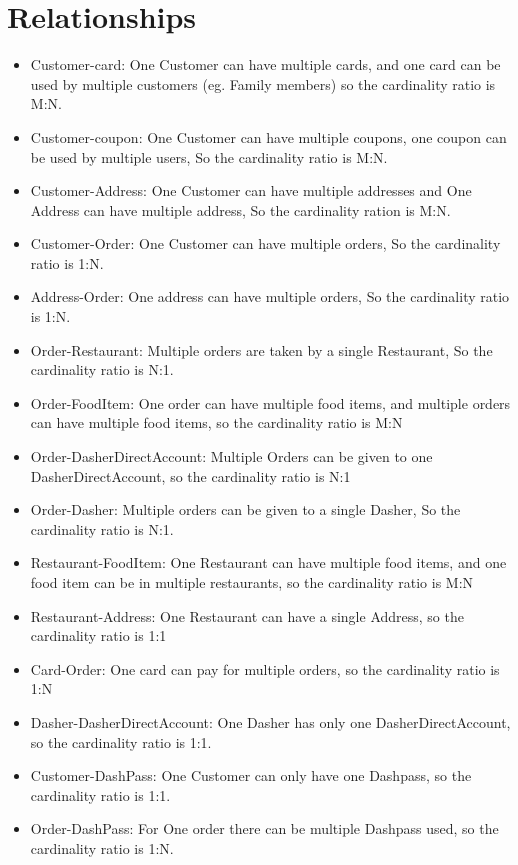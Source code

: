 \documentclass[12pt,letterpaper]{article}
\begin{document}
\section{Relationships}
\begin{itemize}
\item Customer-card: One Customer can have multiple cards, and one card can be used by multiple customers (eg. Family members) so the cardinality ratio is M:N.
\item Customer-coupon: One Customer can have multiple coupons, one coupon can be used by multiple users, So the cardinality ratio is M:N.
\item Customer-Address: One Customer can have multiple addresses and One Address can have multiple address, So the cardinality ration is M:N.
\item Customer-Order: One Customer can have multiple orders, So the cardinality ratio is 1:N.
\item Address-Order: One address can have multiple orders, So the cardinality ratio is 1:N.
\item Order-Restaurant: Multiple orders are taken by a single Restaurant, So the cardinality ratio is N:1.
\item Order-FoodItem: One order can have multiple food items, and multiple orders can have multiple food items, so the cardinality ratio is M:N
\item Order-DasherDirectAccount: Multiple Orders can be given to one DasherDirectAccount, so the cardinality ratio is N:1
\item Order-Dasher: Multiple orders can be given to a single Dasher, So the cardinality ratio is N:1.
\item Restaurant-FoodItem: One Restaurant can have multiple food items, and one food item can be in multiple restaurants, so the cardinality ratio is M:N
\item Restaurant-Address: One Restaurant can have a single Address, so the cardinality ratio is 1:1
\item Card-Order: One card can pay for multiple orders, so the cardinality ratio is 1:N
\item Dasher-DasherDirectAccount: One Dasher has only one DasherDirectAccount, so the cardinality ratio is 1:1.
\item Customer-DashPass: One Customer can only have one Dashpass, so the cardinality ratio is 1:1.
\item Order-DashPass: For One order there can be multiple Dashpass used, so the cardinality ratio is 1:N.

\end{itemize}
\end{document}
